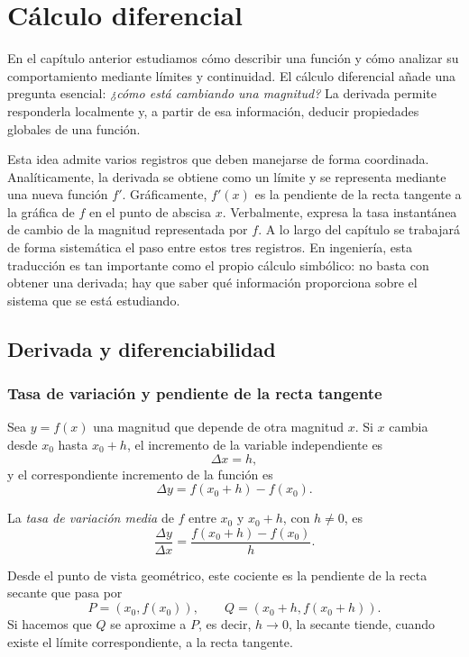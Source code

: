 \chapter{Cálculo diferencial}
\label{ch:diferencial}

En el capítulo anterior estudiamos cómo describir una función y cómo analizar su comportamiento mediante límites y continuidad. El cálculo diferencial añade una pregunta esencial: \emph{¿cómo está cambiando una magnitud?} La derivada permite responderla localmente y, a partir de esa información, deducir propiedades globales de una función.

Esta idea admite varios registros que deben manejarse de forma coordinada. Analíticamente, la derivada se obtiene como un límite y se representa mediante una nueva función $f'$. Gráficamente, $f'(x)$ es la pendiente de la recta tangente a la gráfica de $f$ en el punto de abscisa $x$. Verbalmente, expresa la tasa instantánea de cambio de la magnitud representada por $f$. A lo largo del capítulo se trabajará de forma sistemática el paso entre estos tres registros. En ingeniería, esta traducción es tan importante como el propio cálculo simbólico: no basta con obtener una derivada; hay que saber qué información proporciona sobre el sistema que se está estudiando.

\section{Derivada y diferenciabilidad}
\label{sec:derivada-diferenciabilidad}

\subsection{Tasa de variación y pendiente de la recta tangente}

Sea $y=f(x)$ una magnitud que depende de otra magnitud $x$. Si $x$ cambia desde $x_0$ hasta $x_0+h$, el incremento de la variable independiente es
\[
\Delta x=h,
\]
y el correspondiente incremento de la función es
\[
\Delta y=f(x_0+h)-f(x_0).
\]

\begin{definition}
La \emph{tasa de variación media} de $f$ entre $x_0$ y $x_0+h$, con $h\neq0$, es
\[
\frac{\Delta y}{\Delta x}
=
\frac{f(x_0+h)-f(x_0)}{h}.
\]
\end{definition}

Desde el punto de vista geométrico, este cociente es la pendiente de la recta secante que pasa por
\[
P=(x_0,f(x_0)),
\qquad
Q=(x_0+h,f(x_0+h)).
\]
Si hacemos que $Q$ se aproxime a $P$, es decir, $h\to0$, la secante tiende, cuando existe el límite correspondiente, a la recta tangente.

